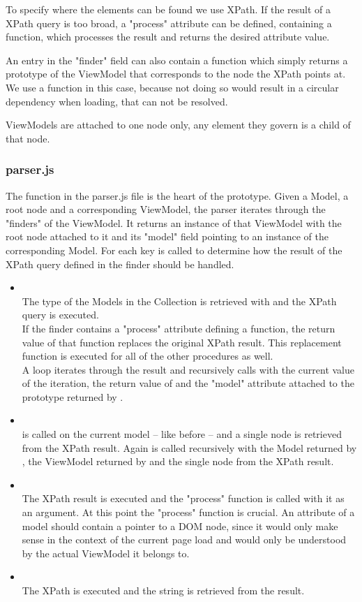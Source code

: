 To specify where the elements can be found we use XPath. If the result of a
XPath query is too broad, a "process" attribute can be defined, containing a
function, which processes the result and returns the desired attribute value.

An entry in the "finder" field can also contain a  function which
simply returns a prototype of the ViewModel that corresponds to the node the
XPath points at. We use a function in this case, because not doing so would
result in a circular dependency when loading, that can not be resolved.

ViewModels are attached to one node only, any element they govern is a child of
that node.
\subsubsection{parser.js}
The  function in the parser.js file is the heart of the
prototype. Given a Model, a root node and a corresponding ViewModel, the parser
iterates through the "finders" of the ViewModel. It returns an instance of that
ViewModel with the root node attached to it and its "model" field pointing to an
instance of the corresponding Model.
For each key  is called to determine how the result of the
XPath query defined in the finder should be handled.
\begin{itemize}
	\item \emph{}\\
	The type of the Models in the Collection is retrieved with
	 and the XPath query is executed.\\
	If the finder contains a "process" attribute defining a function, the return
	value of that function replaces the original XPath result. This replacement
	function is executed for all of the other procedures as well.\\
	A loop iterates through the result and recursively calls
	 with the current value of the iteration, the return
	value of  and the "model" attribute attached to the prototype
	returned by .
	\item \emph{}\\
	 is called on the current model -- like before -- and
	a single node is retrieved from the XPath result. Again
	 is called recursively with the Model returned by
	, the ViewModel returned by  and the
	single node from the XPath result.
	\item \emph{}\\
	The XPath result is executed and the "process" function is called with it as
	an argument. At this point the "process" function is crucial. An attribute of
	a model should contain a pointer to a DOM node, since it would only make sense
	in the context of the current page load and would only be understood by the
	actual ViewModel it belongs to.
	\item \emph{}\\
	The XPath is executed and the string is retrieved from the result.
\end{itemize}
